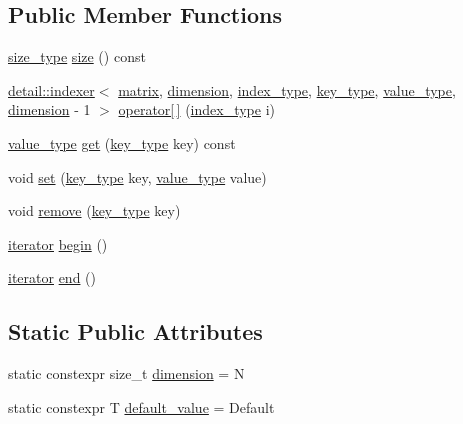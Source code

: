 \subsection*{Public Member Functions}
\begin{DoxyCompactItemize}
\item 
\hyperlink{structmatrix_1_1matrix_aebc6efd587a1c3f0a951631d6ee6837f}{size\+\_\+type} \hyperlink{structmatrix_1_1matrix_a56f1554d0f871ac5e2b3dac89d26113e}{size} () const
\item 
\hyperlink{structmatrix_1_1detail_1_1indexer}{detail\+::indexer}$<$ \hyperlink{structmatrix_1_1matrix}{matrix}, \hyperlink{structmatrix_1_1matrix_a7d76bd51fd998974f59ea4035e053f74}{dimension}, \hyperlink{structmatrix_1_1matrix_a87b61e7f35dcd5991cd3f243cfeced06}{index\+\_\+type}, \hyperlink{structmatrix_1_1matrix_af7b5498ac1b615cb9ef51bd185a2557e}{key\+\_\+type}, \hyperlink{structmatrix_1_1matrix_ab940e7a84942339cdee7c0f0d3bd8ef9}{value\+\_\+type}, \hyperlink{structmatrix_1_1matrix_a7d76bd51fd998974f59ea4035e053f74}{dimension} -\/ 1 $>$ \hyperlink{structmatrix_1_1matrix_a06d5b697d7f64430305967f4adc80633}{operator\mbox{[}$\,$\mbox{]}} (\hyperlink{structmatrix_1_1matrix_a87b61e7f35dcd5991cd3f243cfeced06}{index\+\_\+type} i)
\item 
\hyperlink{structmatrix_1_1matrix_ab940e7a84942339cdee7c0f0d3bd8ef9}{value\+\_\+type} \hyperlink{structmatrix_1_1matrix_a312aeb3131a45703593dd29558dc54da}{get} (\hyperlink{structmatrix_1_1matrix_af7b5498ac1b615cb9ef51bd185a2557e}{key\+\_\+type} key) const
\item 
void \hyperlink{structmatrix_1_1matrix_aec0384fc656feed77a2c71c2ed0065d8}{set} (\hyperlink{structmatrix_1_1matrix_af7b5498ac1b615cb9ef51bd185a2557e}{key\+\_\+type} key, \hyperlink{structmatrix_1_1matrix_ab940e7a84942339cdee7c0f0d3bd8ef9}{value\+\_\+type} value)
\item 
void \hyperlink{structmatrix_1_1matrix_ac15f926245fe20e9dfee3f0695299550}{remove} (\hyperlink{structmatrix_1_1matrix_af7b5498ac1b615cb9ef51bd185a2557e}{key\+\_\+type} key)
\item 
\hyperlink{structmatrix_1_1matrix_1_1iterator}{iterator} \hyperlink{structmatrix_1_1matrix_a3b7a440d3593bf1bcd0719fa76128064}{begin} ()
\item 
\hyperlink{structmatrix_1_1matrix_1_1iterator}{iterator} \hyperlink{structmatrix_1_1matrix_a8cf9448267d3ebbe15bb606b68440952}{end} ()
\end{DoxyCompactItemize}
\subsection*{Static Public Attributes}
\begin{DoxyCompactItemize}
\item 
static constexpr size\+\_\+t \hyperlink{structmatrix_1_1matrix_a7d76bd51fd998974f59ea4035e053f74}{dimension} = N
\item 
static constexpr T \hyperlink{structmatrix_1_1matrix_a4c0193b1fdd949b71f717232cd2c7ce1}{default\+\_\+value} = Default
\end{DoxyCompactItemize}


